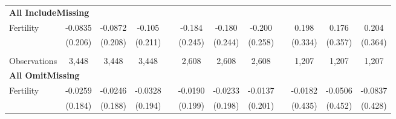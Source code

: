 \begin{landscape}
\begin{table}[htpb!]
\begin{center}
\begin{tabular}{lcccp{2mm}cccp{2mm}ccc}
\multicolumn{12}{l}{\textbf{All IncludeMissing}}\\ 
Fertility&-0.0835&-0.0872&-0.105&&-0.184&-0.180&-0.200&&0.198&0.176&0.204\\
&(0.206)&(0.208)&(0.211)&&(0.245)&(0.244)&(0.258)&&(0.334)&(0.357)&(0.364)\\
\begin{footnotesize}\end{footnotesize}&\begin{footnotesize}\end{footnotesize}&\begin{footnotesize}\end{footnotesize}&\begin{footnotesize}\end{footnotesize}&\begin{footnotesize}\end{footnotesize}&\begin{footnotesize}\end{footnotesize}&\begin{footnotesize}\end{footnotesize}&\begin{footnotesize}\end{footnotesize}&\begin{footnotesize}\end{footnotesize}&\begin{footnotesize}\end{footnotesize}&\begin{footnotesize}\end{footnotesize}&\begin{footnotesize}\end{footnotesize}\\Observations&3,448&3,448&3,448&&2,608&2,608&2,608&&1,207&1,207&1,207\\
\multicolumn{12}{l}{\textbf{All OmitMissing}}\\ 
Fertility&-0.0259&-0.0246&-0.0328&&-0.0190&-0.0233&-0.0137&&-0.0182&-0.0506&-0.0837\\
&(0.184)&(0.188)&(0.194)&&(0.199)&(0.198)&(0.201)&&(0.435)&(0.452)&(0.428)\\

\end{tabular}
\end{center}
\end{table}
\end{landscape}
